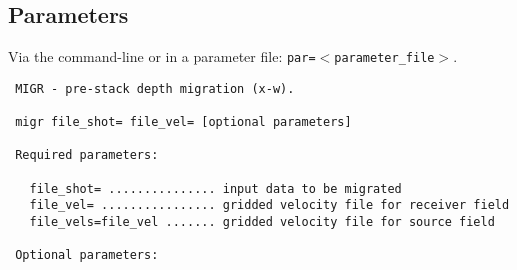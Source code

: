 \subsection{Parameters}
Via the command-line or in a parameter file: {\tt par=$<$parameter\_file$>$}.
{\footnotesize
\begin{verbatim}
 MIGR - pre-stack depth migration (x-w).
  
 migr file_shot= file_vel= [optional parameters]
  
 Required parameters:
 
   file_shot= ............... input data to be migrated
   file_vel= ................ gridded velocity file for receiver field
   file_vels=file_vel ....... gridded velocity file for source field
  
 Optional parameters:
 

\end{verbatim}}
